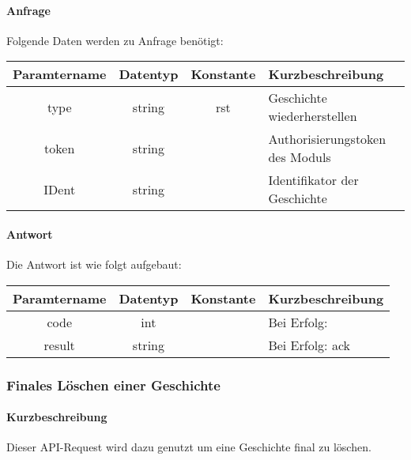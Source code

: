 \paragraph{Anfrage}Folgende Daten werden zu Anfrage benötigt:
\begin{table}[H]
	\begin{tabular}{|c|c|c|p{6.5cm}|}
		\hline
		\textbf{Paramtername} & \textbf{Datentyp} & \textbf{Konstante} & \textbf{Kurzbeschreibung}                                                                                               \\ \hline
		type                & string            & rst                & Geschichte wiederherstellen\\ \hline
		token               & string            &                    & Authorisierungstoken des Moduls \\ \hline
		IDent               & string            &                    & Identifikator der Geschichte \\ \hline
	\end{tabular}
\end{table}
\paragraph{Antwort}Die Antwort ist wie folgt aufgebaut:
\begin{table}[H]
	\begin{tabular}{|c|c|c|p{6.5cm}|}
		\hline
		\textbf{Paramtername} & \textbf{Datentyp} & \textbf{Konstante} & \textbf{Kurzbeschreibung}            \\ \hline                
		code                & int              &                 & Bei Erfolg: {\glqq 0\grqq} \\ \hline
		result              & string           &                 & Bei Erfolg: {\glqq ack\grqq} \\ \hline
	\end{tabular}
\end{table}
\subsubsection{Finales Löschen einer Geschichte}
\paragraph{Kurzbeschreibung}Dieser API-Request wird dazu genutzt um eine Geschichte final zu löschen.
